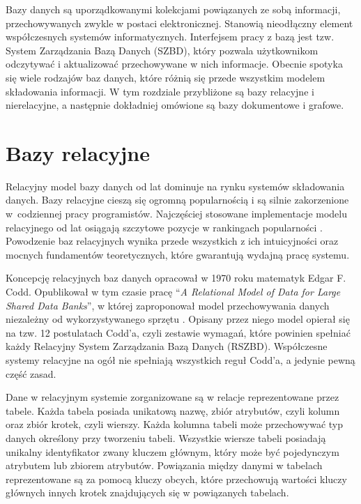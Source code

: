 \documentclass[a4paper,twoside,12pt]{book}
\begin{document}
Bazy danych są uporządkowanymi kolekcjami powiązanych ze sobą informacji, przechowywanych zwykle w postaci elektronicznej. Stanowią nieodłączny element współczesnych systemów informatycznych. Interfejsem pracy z bazą jest tzw. System Zarządzania Bazą Danych (SZBD), który pozwala użytkownikom odczytywać i aktualizować przechowywane w nich informacje. Obecnie spotyka się wiele rodzajów baz danych, które różnią się przede wszystkim modelem składowania informacji. W tym rozdziale przybliżone są bazy relacyjne i nierelacyjne, a następnie dokładniej omówione są bazy dokumentowe i grafowe.

\section{Bazy relacyjne}

Relacyjny model bazy danych od lat dominuje na rynku systemów składowania danych. Bazy relacyjne cieszą się ogromną popularnością i są silnie zakorzenione w~codziennej pracy programistów. Najczęściej stosowane implementacje modelu relacyjnego od lat osiągają szczytowe pozycje w rankingach popularności \cite{bib:db-engines-ranking}. Powodzenie baz relacyjnych wynika przede wszystkich z ich intuicyjności oraz mocnych fundamentów teoretycznych, które gwarantują wydajną pracę systemu.

Koncepcję relacyjnych baz danych opracował w 1970 roku matematyk Edgar F. Codd. Opublikował w tym czasie pracę ``\textit{A Relational Model of Data for Large Shared Data Banks}'', w której zaproponował model przechowywania danych niezależny od wykorzystywanego sprzętu \cite{bib:a-relational-model-of-data-for-large-shared-data-banks}. Opisany przez niego model opierał się na tzw. 12 postulatach Codd'a, czyli zestawie wymagań, które powinien spełniać każdy Relacyjny System Zarządzania Bazą Danych (RSZBD). Współczesne systemy relacyjne na ogół nie spełniają wszystkich reguł Codd'a, a jedynie pewną część zasad.

Dane w relacyjnym systemie zorganizowane są w relacje reprezentowane przez tabele. Każda tabela posiada unikatową nazwę, zbiór atrybutów, czyli kolumn oraz zbiór krotek, czyli wierszy. Każda kolumna tabeli może przechowywać typ danych określony przy tworzeniu tabeli. Wszystkie wiersze tabeli posiadają unikalny identyfikator zwany kluczem głównym, który może być pojedynczym atrybutem lub zbiorem atrybutów. Powiązania między danymi w tabelach reprezentowane są za pomocą kluczy obcych, które przechowują wartości kluczy głównych innych krotek znajdujących się w powiązanych tabelach.
\end{document}
